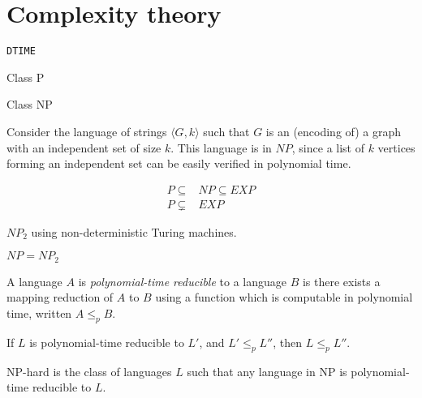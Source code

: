 \section{Complexity theory}

\begin{defn}
    \verb|DTIME|
\end{defn}

\begin{defn}
    Class P
\end{defn}

\begin{defn}
    Class NP
\end{defn}

\begin{exmp}
    Consider the language of strings $\langle G, k \rangle$ such that $G$ is an (encoding of) a graph with an independent set of size $k$. This language is in $NP$, since a list of $k$ vertices forming an independent set can be easily verified in polynomial time.
\end{exmp}

\begin{thm}
    \begin{align*}
        P \subseteq &NP \subseteq EXP \\
        P \subsetneq &EXP
    \end{align*}
\end{thm}

\begin{defn}
    $NP_2$ using non-deterministic Turing machines.
\end{defn}

\begin{thm}
    $NP = NP_2$
\end{thm}

\begin{defn}
    A language $A$ is \emph{polynomial-time reducible} to a language $B$ is there exists a mapping reduction of $A$ to $B$ using a function which is computable in polynomial time, written $A \leq_{p} B$.
\end{defn}

\begin{prop}
    If $L$ is polynomial-time reducible to $L'$, and $L' \leq_{p} L''$, then $L \leq_{p} L''$.
\end{prop}

\begin{defn}
    NP-hard is the class of languages $L$ such that any language in NP is polynomial-time reducible to $L$.
\end{defn}

